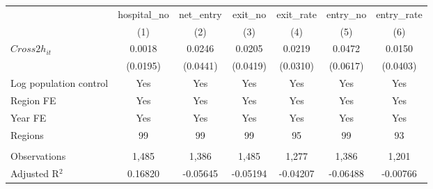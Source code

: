 \begingroup
\centering
\begin{tabular}{lcccccc}
   \toprule
                          & hospital\_no  & net\_entry  & exit\_no  & exit\_rate  & entry\_no  & entry\_rate \\    
                          & (1)           & (2)         & (3)       & (4)         & (5)        & (6)\\  
   \midrule 
   $Cross2h_{it}$         & 0.0018        & 0.0246      & 0.0205    & 0.0219      & 0.0472     & 0.0150\\   
                          & (0.0195)      & (0.0441)    & (0.0419)  & (0.0310)    & (0.0617)   & (0.0403)\\   
   Log population control & Yes           & Yes         & Yes       & Yes         & Yes        & Yes\\  
   Region FE              & Yes           & Yes         & Yes       & Yes         & Yes        & Yes\\  
   Year FE                & Yes           & Yes         & Yes       & Yes         & Yes        & Yes\\  
   Regions                & 99            & 99          & 99        & 95          & 99         & 93\\  
    \\
   Observations           & 1,485         & 1,386       & 1,485     & 1,277       & 1,386      & 1,201\\  
   Adjusted R$^2$         & 0.16820       & -0.05645    & -0.05194  & -0.04207    & -0.06488   & -0.00766\\  
   \bottomrule
\end{tabular}
\par\endgroup
